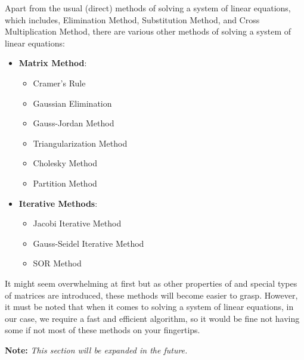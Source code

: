 Apart from the usual (direct) methods of solving a system of linear equations, which includes, Elimination Method, Substitution Method, and Cross Multiplication Method, there are various other methods of solving a system of linear equations:
\begin{itemize}
    \item \textbf{Matrix Method}:
    \begin{itemize}
        \item Cramer's Rule
        \item Gaussian Elimination
        \item Gauss-Jordan Method
        \item Triangularization Method
        \item Cholesky Method
        \item Partition Method
    \end{itemize}
    \item \textbf{Iterative Methods}:
    \begin{itemize}
        \item Jacobi Iterative Method
        \item Gauss-Seidel Iterative Method
        \item SOR Method
    \end{itemize}
\end{itemize}
\para

It might seem overwhelming at first but as other properties of and special types of matrices are introduced, these methods will become easier to grasp. However, it must be noted that when it comes to solving a system of linear equations, in our case, we require a fast and efficient algorithm, so it would be fine not having some if not most of these methods on your fingertips.
\para

\textbf{Note:} \textit{This section will be expanded in the future.}